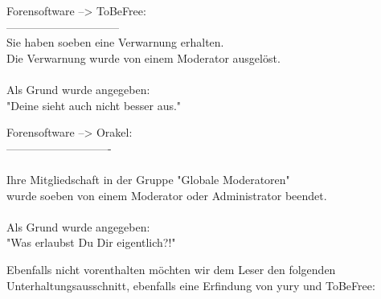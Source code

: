 \noindent \parbox{\textwidth}{

    \begin{footnotesize}
    \begin{itshape}

\noindent Forensoftware --> ToBeFree:\\
\noindent ------------------------------\\
\noindent Sie haben soeben eine Verwarnung erhalten.\\
\noindent Die Verwarnung wurde von einem Moderator ausgelöst.\\
\noindent ~\\
\noindent Als Grund wurde angegeben:\\
\noindent "Deine sieht auch nicht besser aus."\\

    \end{itshape}
    \end{footnotesize}

}

\noindent \parbox{\textwidth}{

    \begin{footnotesize}
    \begin{itshape}
    \begin{flushright}

\noindent Forensoftware --> Orakel:\\
\noindent ----------------------------\\
\noindent ~\\
\noindent Ihre Mitgliedschaft in der Gruppe "Globale Moderatoren"\\
\noindent wurde soeben von einem Moderator oder Administrator beendet.\\
\noindent ~\\
\noindent Als Grund wurde angegeben:\\
\noindent "Was erlaubst Du Dir eigentlich?!"\\

    \end{flushright}
    \end{itshape}
    \end{footnotesize}

}

Ebenfalls nicht vorenthalten möchten wir dem Leser den folgenden Unterhaltungsausschnitt, ebenfalls eine Erfindung von yury und ToBeFree:

